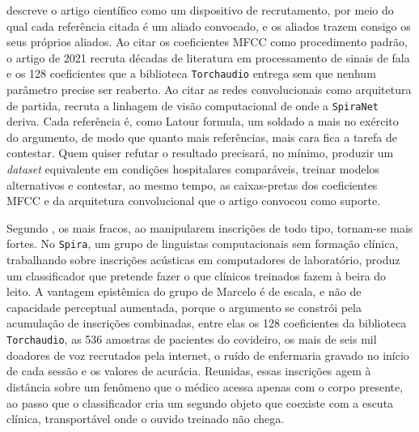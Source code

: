 \textcite{Latour2011CienciaEmAcao} descreve o artigo científico como um dispositivo de recrutamento, por meio do qual cada referência citada é um aliado convocado, e os aliados trazem consigo os seus próprios aliados. Ao citar os coeficientes MFCC como procedimento padrão, o artigo de 2021 recruta décadas de literatura em processamento de sinais de fala e os 128 coeficientes que a biblioteca \texttt{Torchaudio} entrega sem que nenhum parâmetro precise ser reaberto. Ao citar as redes convolucionais como arquitetura de partida, recruta a linhagem de visão computacional de onde a \texttt{SpiraNet} deriva. Cada referência é, como Latour formula, um soldado a mais no exército do argumento, de modo que quanto mais referências, mais cara fica a tarefa de contestar. Quem quiser refutar o resultado precisará, no mínimo, produzir um \textit{dataset} equivalente em condições hospitalares comparáveis, treinar modelos alternativos e contestar, ao mesmo tempo, as caixas-pretas dos coeficientes MFCC e da arquitetura convolucional que o artigo convocou como suporte.

Segundo \textcite{Latour1986Visualization}, os mais fracos, ao manipularem inscrições de todo tipo, tornam-se mais fortes. No \texttt{Spira}, um grupo de linguistas computacionais sem formação clínica, trabalhando sobre inscrições acústicas em computadores de laboratório, produz um classificador que pretende fazer o que clínicos treinados fazem à beira do leito. A vantagem epistêmica do grupo de Marcelo é de escala, e não de capacidade perceptual aumentada, porque o argumento se constrói pela acumulação de inscrições combinadas, entre elas os 128 coeficientes da biblioteca \texttt{Torchaudio}, as 536 amostras de pacientes do covideiro, os mais de seis mil doadores de voz recrutados pela internet, o ruído de enfermaria gravado no início de cada sessão e os valores de acurácia. Reunidas, essas inscrições agem à distância sobre um fenômeno que o médico acessa apenas com o corpo presente, ao passo que o classificador cria um segundo objeto que coexiste com a escuta clínica, transportável onde o ouvido treinado não chega.

